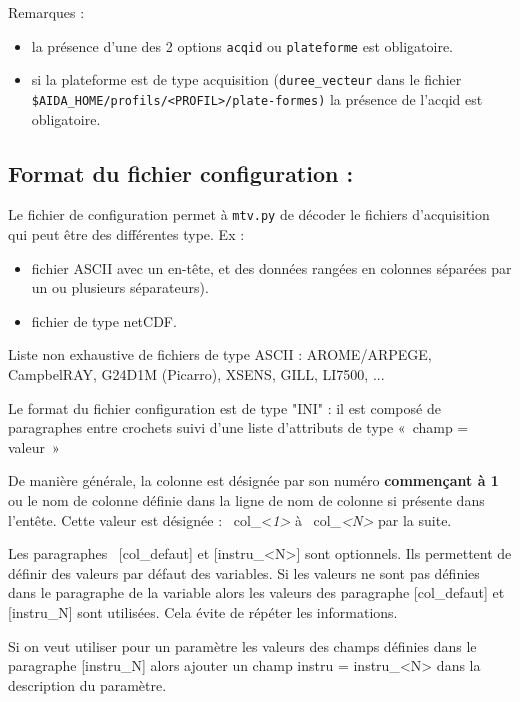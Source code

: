 \medskip
Remarques :

\begin{itemize}
\item la présence d'une des 2 options \texttt{acqid} ou \texttt{plateforme} est obligatoire.
\item si la plateforme est de type acquisition (\texttt{duree\_vecteur} dans le fichier \\
      \texttt{\$AIDA\_HOME/profils/<PROFIL>/plate-formes)} la présence de l'acqid est obligatoire.
\end{itemize}

\subsection {Format du fichier configuration :}
Le fichier de configuration permet à \texttt{mtv.py} de décoder le fichiers
d'acquisition qui peut être des différentes type. Ex :
\begin{itemize}
  \item fichier ASCII avec un en-tête, et des données rangées en colonnes séparées par un ou plusieurs séparateurs).
  \item fichier de type netCDF.
\end{itemize}

\medskip
Liste non exhaustive de fichiers de type ASCII : AROME/ARPEGE, CampbelRAY, G24D1M (Picarro), XSENS, GILL, LI7500, ...

\medskip
Le format du fichier configuration est de type "INI" : il est composé de paragraphes entre crochets suivi d'une liste
d'attributs de type «~champ = valeur~»

\medskip
De manière générale, la colonne est désignée par son numéro \textbf{commençant à 1} ou le nom de colonne définie dans la
ligne de nom de colonne si présente dans l'entête. Cette valeur est désignée :
\ col\_{\textless}\textit{1{\textgreater}} à \ col\textit{\_{\textless}N{\textgreater}} par la suite.

\medskip
Les paragraphes \ [col\_defaut] et [instru\_{\textless}N{\textgreater}] sont optionnels. Ils permettent de définir des
valeurs par défaut des variables. Si les valeurs ne sont pas définies dans le paragraphe de la variable alors les
valeurs des paragraphe [col\_defaut] et [instru\_N] sont utilisées. Cela évite de répéter les informations.

Si on veut utiliser pour un paramètre les valeurs des champs définies dans le paragraphe [instru\_N] alors ajouter un
champ instru = instru\_{\textless}N{\textgreater} dans la description du paramètre.

